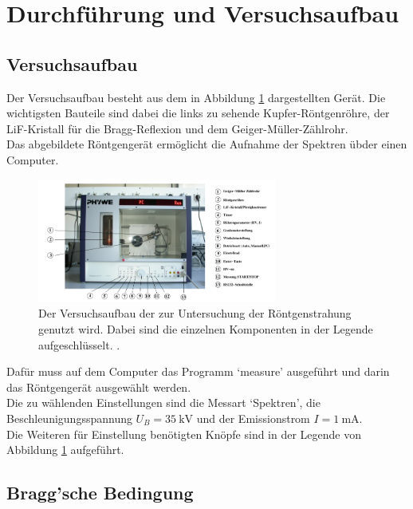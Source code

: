 \newpage
\section{Durchführung und Versuchsaufbau}

\subsection{Versuchsaufbau}

\noindent Der Versuchsaufbau besteht aus dem in Abbildung \ref{img:aufbau} dargestellten Gerät. 
Die wichtigsten Bauteile sind dabei die links zu sehende Kupfer-Röntgenröhre, der LiF-Kristall für die Bragg-Reflexion und dem Geiger-Müller-Zählrohr.\\
Das abgebildete Röntgengerät ermöglicht die Aufnahme der Spektren übder einen Computer.
\begin{figure}[ht]
    \centering
    \includegraphics[width=0.7\textwidth]{latex/images/aufbau.PNG}
    \caption{Der Versuchsaufbau der zur Untersuchung der Röntgenstrahung genutzt wird. Dabei sind die einzelnen Komponenten in der Legende aufgeschlüsselt. \protect \cite{V401}.}
    \label{img:aufbau}
\end{figure}

\noindent Dafür muss auf dem Computer das Programm \enquote*{measure} ausgeführt und darin das Röntgengerät ausgewählt werden.\\
Die zu wählenden Einstellungen sind die Messart \enquote*{Spektren}, die Beschleunigungsspannung $U_B=\SI{35}{\kilo\volt}$ und der Emissionstrom $I=\SI{1}{\milli\ampere}$.\\
Die Weiteren für Einstellung benötigten Knöpfe sind in der Legende von Abbildung \ref{img:aufbau} aufgeführt.


\subsection{Bragg'sche Bedingung}


